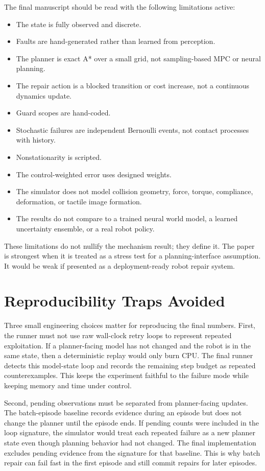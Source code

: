 \documentclass{article}
\begin{document}
The final manuscript should be read with the following limitations active:
\begin{itemize}
    \item The state is fully observed and discrete.
    \item Faults are hand-generated rather than learned from perception.
    \item The planner is exact A* over a small grid, not sampling-based MPC or neural planning.
    \item The repair action is a blocked transition or cost increase, not a continuous dynamics update.
    \item Guard scopes are hand-coded.
    \item Stochastic failures are independent Bernoulli events, not contact processes with history.
    \item Nonstationarity is scripted.
    \item The control-weighted error uses designed weights.
    \item The simulator does not model collision geometry, force, torque, compliance, deformation, or tactile image formation.
    \item The results do not compare to a trained neural world model, a learned uncertainty ensemble, or a real robot policy.
\end{itemize}

These limitations do not nullify the mechanism result; they define it. The paper is strongest when it is treated as a stress test for a planning-interface assumption. It would be weak if presented as a deployment-ready robot repair system.

\section{Reproducibility Traps Avoided}

Three small engineering choices matter for reproducing the final numbers. First, the runner must not use raw wall-clock retry loops to represent repeated exploitation. If a planner-facing model has not changed and the robot is in the same state, then a deterministic replay would only burn CPU. The final runner detects this model-state loop and records the remaining step budget as repeated counterexamples. This keeps the experiment faithful to the failure mode while keeping memory and time under control.

Second, pending observations must be separated from planner-facing updates. The batch-episode baseline records evidence during an episode but does not change the planner until the episode ends. If pending counts were included in the loop signature, the simulator would treat each repeated failure as a new planner state even though planning behavior had not changed. The final implementation excludes pending evidence from the signature for that baseline. This is why batch repair can fail fast in the first episode and still commit repairs for later episodes.
\end{document}
